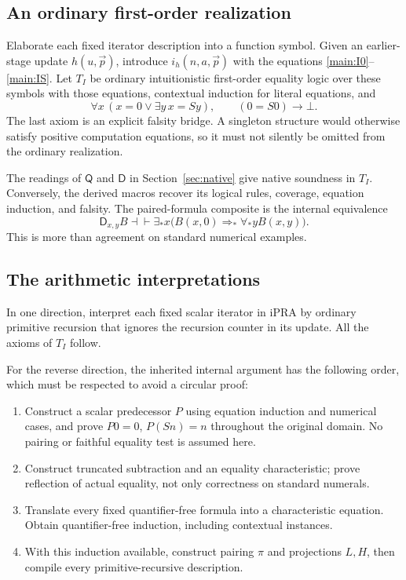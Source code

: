 \documentclass[11pt,letterpaper]{article}
\theoremstyle{definition}\newtheorem{definition}[theorem]{Definition}
\theoremstyle{remark}\newtheorem{remark}[theorem]{Remark}
\newcommand{\D}{\mathsf D}
\newcommand{\Q}{\mathsf Q}
\begin{document}
\subsection{An ordinary first-order realization}

Elaborate each fixed iterator description into a function symbol. Given
an earlier-stage update $h(u,\vec p)$, introduce $i_h(n,a,\vec p)$ with
the equations \eqref{main:I0}--\eqref{main:IS}. Let $T_I$ be ordinary
intuitionistic first-order equality logic over these symbols with those
equations, contextual induction for literal equations, and
\[
 \forall x\,(x=0\vee\exists y\,x=Sy),\qquad
 (0=S0)\longrightarrow\bot.
\]
The last axiom is an explicit falsity bridge. A singleton structure would
otherwise satisfy positive computation equations, so it must not silently
be omitted from the ordinary realization.

The readings of $\Q$ and $\D$ in Section~\ref{sec:native} give native
soundness in $T_I$. Conversely, the derived macros recover its logical
rules, coverage, equation induction, and falsity. The paired-formula
composite is the internal equivalence
\[
 \D_{x,y}B\dashv\vdash
 \exists_*x\bigl(B(x,0)\Rightarrow_*\forall_*yB(x,y)\bigr).
\]
This is more than agreement on standard numerical examples.

\subsection{The arithmetic interpretations}

In one direction, interpret each fixed scalar iterator in iPRA by
ordinary primitive recursion that ignores the recursion counter in its
update. All the axioms of $T_I$ follow.

For the reverse direction, the inherited internal argument has the
following order, which must be respected to avoid a circular proof:
\begin{enumerate}
\item Construct a scalar predecessor $P$ using equation induction and
numerical cases, and prove $P0=0$, $P(Sn)=n$ throughout the original
domain. No pairing or faithful equality test is assumed here.
\item Construct truncated subtraction and an equality characteristic;
prove reflection of actual equality, not only correctness on standard
numerals.
\item Translate every fixed quantifier-free formula into a characteristic
equation. Obtain quantifier-free induction, including contextual
instances.
\item With this induction available, construct pairing $\pi$ and
projections $L,H$, then compile every primitive-recursive description.
\end{enumerate}
\end{document}
